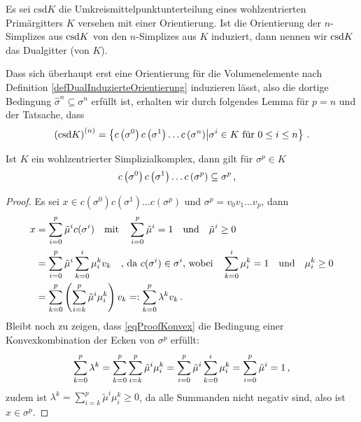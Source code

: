     \begin{definition}
      \label{defDualgitter}
      Es sei \( \text{csd}K \) die Umkreismittelpunktunterteilung eines wohlzentrierten Primärgitters \( K \) versehen mit einer Orientierung.
      Ist die Orientierung der \( n \)-Simplizes aus \( \text{csd} K \) von den \( n \)-Simplizes aus \( K \) induziert, dann nennen wir \( \text{csd} K \) das Dualgitter (von \( K \)).
    \end{definition}
    Dass sich überhaupt erst eine Orientierung für die Volumenelemente nach Definition \ref{defDualInduzierteOrientierung} induzieren lässt, 
    also die dortige Bedingung \( \hat{\sigma}^{n} \subseteq \sigma^{n}\) erfüllt ist, erhalten wir durch folgendes Lemma für
    \( p = n \) und der Tatsache, dass 
    \begin{align}
      \left( \text{csd} K \right)^{(n)} = \left\{ c\left( \sigma^{0} \right) c\left( \sigma^{1} \right) \ldots c\left( \sigma^{n} \right) \middle|
                                                                              \sigma^{i}\in K \text { für } 0 \le i \le n    \right\} \,\text{.}
    \end{align}
    \begin{lemma}
      Ist \( K \) ein wohlzentrierter Simplizialkomplex, dann gilt für \( \sigma^{p}\in K \)
      \begin{align}
        c\left( \sigma^{0} \right) c\left( \sigma^{1} \right) \ldots c\left( \sigma^{p} \right) &\subseteq \sigma^{p} \,\text{,}
      \end{align}
      \begin{proof}
        Es sei \( x\in c\left( \sigma^{0} \right) c\left( \sigma^{1} \right) \ldots c\left( \sigma^{p} \right)\) 
        und \( \sigma^{p} = v_{0}v_{1}\ldots v_{p} \), dann
        \begin{align}
          x &= \sum_{i=0}^{p} \tilde{\mu}^{i}c(\sigma^{i}) \quad\text{mit}\quad \sum_{i=0}^{p}\tilde{\mu}^{i} = 1 \quad\text{und}\quad \tilde{\mu}^{i} \ge 0 \\
            &= \sum_{i=0}^{p} \tilde{\mu}^{i} \sum_{k=0}^{i}\mu_{i}^{k} v_{k} \quad\text{, da \( c(\sigma^{i})\in\sigma^{i} \), wobei}\quad  \sum_{k=0}^{i}\mu_{i}^{k} = 1 \quad\text{und}\quad \mu_{i}^{k} \ge 0 \\
            &= \sum_{k=0}^{p} \left( \sum_{i=k}^{p} \tilde{\mu}^{i} \mu_{i}^{k} \right) v_{k}
             =: \sum_{k=0}^{p} \lambda^{k} v_{k} \,\text{.} \label{eqProofKonvex}
        \end{align}
        Bleibt noch zu zeigen, dass \eqref{eqProofKonvex} die Bedingung einer Konvexkombination der Ecken von \( \sigma^{p} \) erfüllt:
        \begin{align}
           \sum_{k=0}^{p} \lambda^{k} = \sum_{k=0}^{p} \sum_{i=k}^{p} \tilde{\mu}^{i} \mu_{i}^{k}
                                      = \sum_{i=0}^{p} \tilde{\mu}^{i} \sum_{k=0}^{i}\mu_{i}^{k}
                                      = \sum_{i=0}^{p} \tilde{\mu}^{i}
                                      = 1 \,\text{,}
        \end{align}
        zudem ist \( \lambda^{k} = \sum_{i=k}^{p} \tilde{\mu}^{i} \mu_{i}^{k}  \ge 0\), da alle Summanden nicht negativ sind, also ist \( x \in \sigma^{p} \).
      \end{proof}
    \end{lemma}

